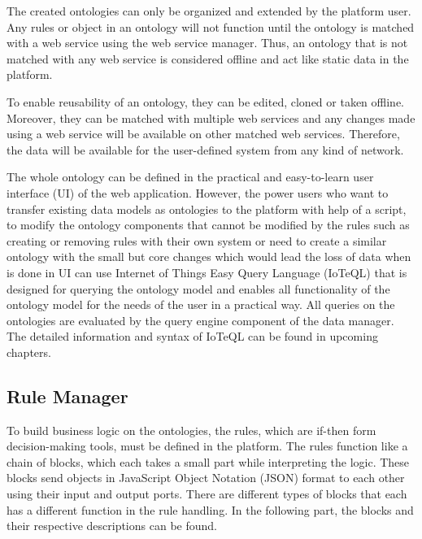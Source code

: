 The created ontologies can only be organized and extended by the platform user. Any rules or object in an ontology will not function until the ontology is matched with a web service using the web service manager. Thus, an ontology that is not matched with any web service is considered offline and act like static data in the platform.

To enable reusability of an ontology, they can be edited, cloned or taken offline. Moreover, they can be matched with multiple web services and any changes made using a web service will be available on other matched web services. Therefore, the data will be available for the user-defined system from any kind of network.

The whole ontology can be defined in the practical and easy-to-learn user interface (UI) of the web application. However, the power users who want to transfer existing data models as ontologies to the platform with help of a script, to modify the ontology components that cannot be modified by the rules such as creating or removing rules with their own system or need to create a similar ontology with the small but core changes which would lead the loss of data when is done in UI can use Internet of Things Easy Query Language (IoTeQL) that is designed for querying the ontology model and enables all functionality of the ontology model for the needs of the user in a practical way. All queries on the ontologies are evaluated by the query engine component of the data manager. The detailed information and syntax of IoTeQL can be found in upcoming chapters. %


\subsection{Rule Manager}
\label{ss:rule_manager}

To build business logic on the ontologies, the rules, which are if-then form decision-making tools, must be defined in the platform. The rules function like a chain of blocks, which each takes a small part while interpreting the logic. These blocks send objects in JavaScript Object Notation (JSON) format to each other using their input and output ports. There are different types of blocks that each has a different function in the rule handling. In the following part, the blocks and their respective descriptions can be found.

